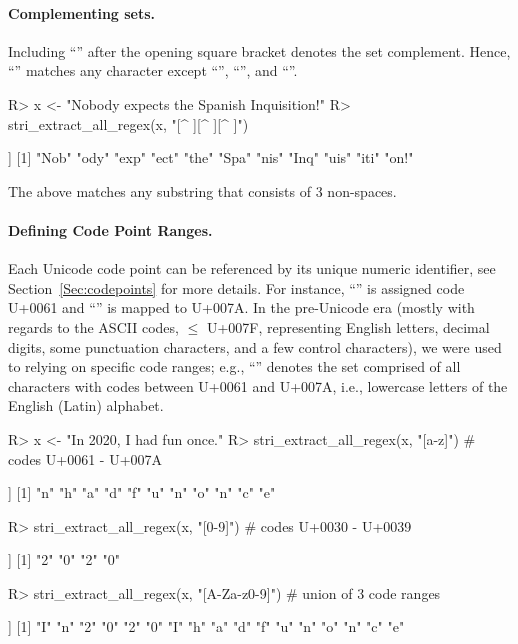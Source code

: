 \documentclass[nojss]{jss}\usepackage[]{graphicx}\usepackage[]{color}
\begin{document}
\paragraph{Complementing sets.}
Including ``\code{\^{}}'' after the opening square bracket denotes the set complement.
Hence, ``\code{[\^{}abc]}'' matches any character except ``'',
``'', and ``''.

\begin{Schunk}
\begin{Sinput}
R> x <- "Nobody expects the Spanish Inquisition!"
R> stri_extract_all_regex(x, "[^ ][^ ][^ ]")
\end{Sinput}
\begin{Soutput}
[[1]]
 [1] "Nob" "ody" "exp" "ect" "the" "Spa" "nis" "Inq" "uis" "iti" "on!"
\end{Soutput}
\end{Schunk}

\noindent
The above matches any substring that consists of 3 non-spaces.

\paragraph{Defining Code Point Ranges.}
Each Unicode code point can be referenced by its unique numeric identifier,
see Section~\ref{Sec:codepoints}  for more details.
For instance, ``'' is assigned code U+0061 and ``'' is mapped to U+007A.
In the pre-Unicode era (mostly with regards to the ASCII codes, $\le$ U+007F,
representing English letters, decimal digits, some punctuation characters,
and a few control characters),
we were used to relying on specific code ranges; e.g.,
``\code{[a-z]}'' denotes the set comprised of all
characters with codes between U+0061 and U+007A, i.e., lowercase letters
of the English (Latin) alphabet.

\begin{Schunk}
\begin{Sinput}
R> x <- "In 2020, I had fun once."
R> stri_extract_all_regex(x, "[a-z]")        # codes U+0061 - U+007A
\end{Sinput}
\begin{Soutput}
[[1]]
 [1] "n" "h" "a" "d" "f" "u" "n" "o" "n" "c" "e"
\end{Soutput}
\begin{Sinput}
R> stri_extract_all_regex(x, "[0-9]")        # codes U+0030 - U+0039
\end{Sinput}
\begin{Soutput}
[[1]]
[1] "2" "0" "2" "0"
\end{Soutput}
\begin{Sinput}
R> stri_extract_all_regex(x, "[A-Za-z0-9]")  # union of 3 code ranges
\end{Sinput}
\begin{Soutput}
[[1]]
 [1] "I" "n" "2" "0" "2" "0" "I" "h" "a" "d" "f" "u" "n" "o" "n" "c" "e"
\end{Soutput}
\end{Schunk}
\end{document}
